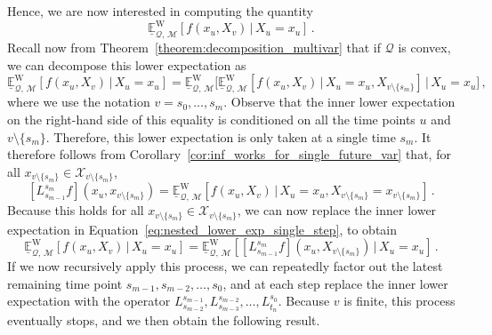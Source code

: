\documentclass[10pt,a4paper]{paper}
\theoremstyle{definition}
\newtheorem{exmp}{Example}%
\newcommand{\states}{\mathcal{X}}
\newcommand{\processes}{\mathbb{P}}
\newcommand{\wprocesses}{\processes^{\mathrm{W}}}
\newcommand{\wmprocesses}{\processes^{\mathrm{WM}}}
\newcommand{\gambles}{\mathcal{L}}
\newcommand{\rateset}{\mathcal{Q}}
\newcommand{\exampleend}{\hfill$\Diamond$}
\begin{document}
Hence, we are now interested in computing the quantity
\begin{equation*}
\underline{\mathbb{E}}_{\rateset,\,\mathcal{M}}^{\mathrm{W}}[f(x_u,X_v)\,\vert\,X_u=x_u]\,.
\end{equation*}
Recall now from Theorem~\ref{theorem:decomposition_multivar} that if $\rateset$ is convex, we can decompose this lower expectation as
\begin{equation}\label{eq:nested_lower_exp_single_step}
\underline{\mathbb{E}}_{\rateset,\,\mathcal{M}}^{\mathrm{W}}[f(x_u,X_v)\,\vert\,X_u=x_u] = \underline{\mathbb{E}}_{\rateset,\,\mathcal{M}}^{\mathrm{W}}\bigl[ \underline{\mathbb{E}}_{\rateset,\,\mathcal{M}}^{\mathrm{W}}[f(x_u,X_v)\,\vert\,X_u=x_u,X_{v\setminus\{s_m\}}] \,\big\vert\,X_u=x_u\bigr]\,,
\end{equation}
where we use the notation $v=s_0,\ldots,s_m$. Observe that the inner lower expectation on the right-hand side of this equality is conditioned on all the time points $u$ and $v\setminus\{s_m\}$. Therefore, this lower expectation is only taken at a single time $s_m$. It therefore follows from Corollary~\ref{cor:inf_works_for_single_future_var} that, for all $x_{v\setminus\{s_m\}}\in\states_{v\setminus\{s_m\}}$,
\begin{equation*}
\left[L_{s_{m-1}}^{s_m}f\right]\left(x_u,x_{v\setminus\{s_m\}}\right) = \underline{\mathbb{E}}_{\rateset,\,\mathcal{M}}^{\mathrm{W}}[f(x_u,X_v)\,\vert\,X_u=x_u,X_{v\setminus\{s_m\}}=x_{v\setminus\{s_m\}}]\,.
\end{equation*}
Because this holds for all $x_{v\setminus\{s_m\}}\in\states_{v\setminus\{s_m\}}$, we can now replace the inner lower expectation in Equation~\eqref{eq:nested_lower_exp_single_step}, to obtain
\begin{equation*}
\underline{\mathbb{E}}_{\rateset,\,\mathcal{M}}^{\mathrm{W}}[f(x_u,X_v)\,\vert\,X_u=x_u] = \underline{\mathbb{E}}_{\rateset,\,\mathcal{M}}^{\mathrm{W}}\left[ \left[L_{s_{m-1}}^{s_m}f\right]\left(x_u,X_{v\setminus\{s_m\}}\right) \,\big\vert\,X_u=x_u\right]\,.
\end{equation*}
If we now recursively apply this process, we can repeatedly factor out the latest remaining time point $s_{m-1}, s_{m-2},\ldots,s_{0}$, and at each step replace the inner lower expectation with the operator $L_{s_{m-2}}^{s_{m-1}},L_{s_{m-3}}^{s_{m-2}},\ldots,L_{t_n}^{s_0}$. Because $v$ is finite, this process eventually stops, and we then obtain the following result.

%
\end{document}
